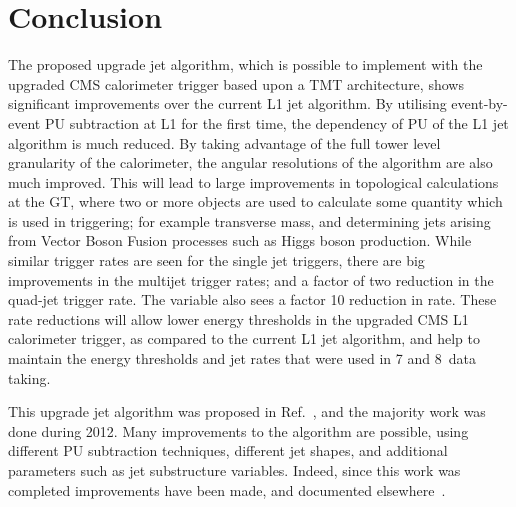 \section{Conclusion}
The proposed upgrade jet algorithm, which is possible to implement with the upgraded \ac{CMS} calorimeter trigger based upon a \ac{TMT} architecture, shows significant improvements over the current \ac{L1} jet algorithm.
By utilising event-by-event \ac{PU} subtraction at \ac{L1} for the first time, the dependency of \ac{PU} of the \ac{L1} jet algorithm is much reduced.
By taking advantage of the full tower level granularity of the calorimeter, the angular resolutions of the algorithm are also much improved.
This will lead to large improvements in topological calculations at the \ac{GT}, where two or more objects are used to calculate some quantity which is used in triggering; for example transverse mass, and determining jets arising from Vector Boson Fusion processes such as Higgs boson production.
While similar trigger rates are seen for the single jet triggers, there are big improvements in the multijet trigger rates; and a factor of two reduction in the quad-jet trigger rate.
The \HT variable also sees a factor 10 reduction in rate.
These rate reductions will allow lower energy thresholds in the upgraded \ac{CMS} \ac{L1} calorimeter trigger, as compared to the current \ac{L1} jet algorithm, and help to maintain the energy thresholds and jet rates that were used in 7 and 8~\TeV data taking.


This upgrade jet algorithm was proposed in Ref.~\cite{Tapper:1556311}, and the majority work was done during 2012. 
Many improvements to the algorithm are possible, using different \ac{PU} subtraction techniques, different jet shapes, and additional parameters such as jet substructure variables.
Indeed, since this work was completed improvements have been made, and documented elsewhere~\cite{recentL1jetWork}.

